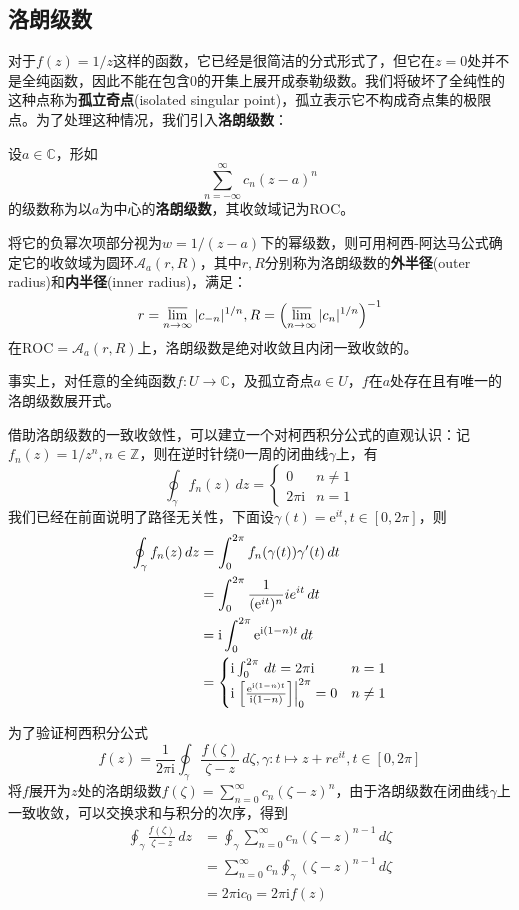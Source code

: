 \subsection{洛朗级数}\label{sub:laurant_series}
对于$f(z)=1/z$这样的函数，它已经是很简洁的分式形式了，但它在$z=0$处并不是全纯函数，因此不能在包含0的开集上展开成泰勒级数。我们将破坏了全纯性的这种点称为\textbf{孤立奇点}(isolated singular point)，孤立表示它不构成奇点集的极限点。为了处理这种情况，我们引入\textbf{洛朗级数}：

\begin{definition}[洛朗级数]
    设$a\in\mathbb{C}$，形如
    \[\sum_{n=-\infty}^{\infty}c_n(z-a)^n\]
    的级数称为以$a$为中心的\textbf{洛朗级数}，其收敛域记为ROC。

    将它的负幂次项部分视为$w=1/(z-a)$下的幂级数，则可用柯西-阿达马公式确定它的收敛域为圆环$\mathcal{A} _a(r,R)$，其中$r,R$分别称为洛朗级数的\textbf{外半径}(outer radius)和\textbf{内半径}(inner radius)，满足：
    \[r=\varlimsup_{n\to\infty}|c_{-n}|^{1/n},R=\left(\varlimsup_{n\to\infty}|c_n|^{1/n}\right)^{-1}\]
    在$\text{ROC}=\mathcal{A} _a(r,R)$上，洛朗级数是绝对收敛且内闭一致收敛的。
\end{definition}
事实上，对任意的全纯函数$f:U\to\mathbb{C}$，及孤立奇点$a\in U$，$f$在$a$处存在且有唯一的洛朗级数展开式。

借助洛朗级数的一致收敛性，可以建立一个对柯西积分公式的直观认识：记$f_n(z)=1/z^n,n\in\mathbb{Z}$，则在逆时针绕0一周的闭曲线$\gamma$上，有
\[\oint_{\gamma}f_n(z)\,dz=\begin{cases}0&n\neq 1\\2\pi \mathrm{i}&n=1\end{cases}\]
我们已经在前面说明了路径无关性，下面设$\gamma(t)=\mathrm{e}^{it},t\in[0,2\pi]$，则
\begin{align*}
    \oint_{\gamma}f_n(z)\,dz&=\int_0^{2\pi}f_n(\gamma(t))\gamma'(t)\,dt\\
    &=\int_0^{2\pi}\frac{1}{(\mathrm{e}^{it})^n} ie^{it}\,dt\\
    &=\mathrm{i}\int_0^{2\pi}\mathrm{e}^{\mathrm{i}(1-n)t}\,dt\\
    &=\begin{cases}
        \mathrm{i}\int_0^{2\pi}\,dt=2\pi \mathrm{i}&n=1\\
        \mathrm{i}\left.\left[\frac{\mathrm{e}^{\mathrm{i}(1-n)t}}{\mathrm{i}(1-n)}\right]\right|_{0}^{2\pi}=0&n\neq 1
    \end{cases}
\end{align*}

为了验证柯西积分公式
\[f(z)=\frac{1}{2\pi \mathrm{i}}\oint_{\gamma}\frac{f(\zeta)}{\zeta-z}\,d\zeta,\gamma:t\mapsto z+re^{it},t\in[0,2\pi]\]将$f$展开为$z$处的洛朗级数$f(\zeta)=\sum_{n=0}^{\infty}c_n (\zeta-z)^n$，由于洛朗级数在闭曲线$\gamma$上一致收敛，可以交换求和与积分的次序，得到
\begin{align*}
    \oint_{\gamma}\frac{f(\zeta)}{\zeta-z}\,dz&=\oint_{\gamma}\sum_{n=0}^{\infty}c_n (\zeta-z)^{n-1}\,d\zeta\\
    &=\sum_{n=0}^{\infty}c_n\oint_{\gamma}(\zeta-z)^{n-1}\,d\zeta\\
    &=2\pi \mathrm{i} c_0=2\pi \mathrm{i} f(z)
\end{align*}


